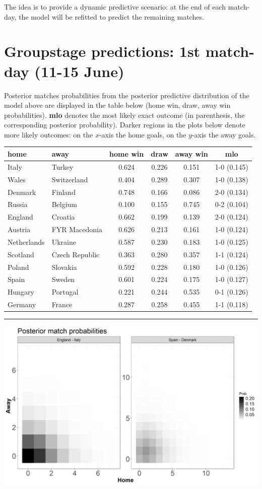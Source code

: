 \documentclass[10pt,]{article}
\begin{document}
The idea is to provide a dynamic predictive scenario: at the end of each
match-day, the model will be refitted to predict the remaining matches.

\section{Groupstage predictions: 1st match-day (11-15
June)}\label{groupstage-predictions-1st-day-11-15-june}

Posterior matches probabilities from the posterior predictive
distribution of the model above are displayed in the table below (home win, draw, away win probabilities).
\textbf{mlo} denotes the most likely exact outcome (in parenthesis, the
corresponding posterior probability). Darker regions in the plots below
denote more likely outcomes: on the \(x\)-axis the home goals, on the
\(y\)-axis the away goals.

\begin{longtable}[]{@{}llcccc@{}}
\toprule
home & away & home win & draw & away win & mlo\tabularnewline
\midrule
\endhead
Italy & Turkey & 0.624 & 0.226 & 0.151 & 1-0 (0.145)\tabularnewline
Wales & Switzerland & 0.404 & 0.289 & 0.307 & 1-0 (0.138)\tabularnewline
Denmark & Finland & 0.748 & 0.166 & 0.086 & 2-0 (0.134)\tabularnewline
Russia & Belgium & 0.100 & 0.155 & 0.745 & 0-2 (0.104)\tabularnewline
England & Croatia & 0.662 & 0.199 & 0.139 & 2-0 (0.124)\tabularnewline
Austria & FYR Macedonia & 0.626 & 0.213 & 0.161 & 1-0
(0.124)\tabularnewline
Netherlands & Ukraine & 0.587 & 0.230 & 0.183 & 1-0
(0.125)\tabularnewline
Scotland & Czech Republic & 0.363 & 0.280 & 0.357 & 1-1
(0.124)\tabularnewline
Poland & Slovakia & 0.592 & 0.228 & 0.180 & 1-0 (0.126)\tabularnewline
Spain & Sweden & 0.601 & 0.224 & 0.175 & 1-0 (0.127)\tabularnewline
Hungary & Portugal & 0.221 & 0.244 & 0.535 & 0-1 (0.126)\tabularnewline
Germany & France & 0.287 & 0.258 & 0.455 & 1-1 (0.118)\tabularnewline
\bottomrule
\end{longtable}

\begin{center}\rule{0.5\linewidth}{0.5pt}\end{center}

\begin{center}\includegraphics[width=0.8\linewidth]{figs/data2-1} \end{center}
\end{document}
